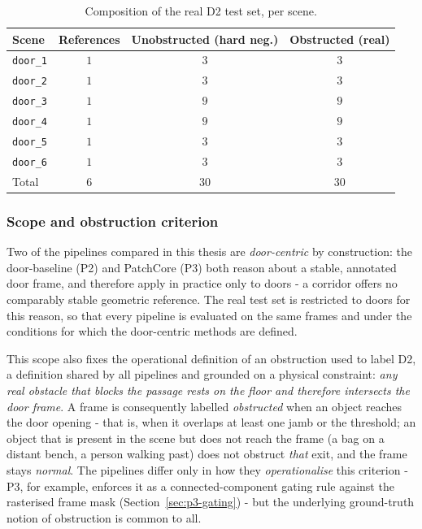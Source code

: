 \begin{table}[h]
  \centering
  \begin{tabular}{lccc}
    \hline
    Scene & References & Unobstructed (hard neg.) & Obstructed (real) \\
    \hline
    \texttt{door\_1} & $1$ & $3$ & $3$ \\
    \texttt{door\_2} & $1$ & $3$ & $3$ \\
    \texttt{door\_3} & $1$ & $9$ & $9$ \\
    \texttt{door\_4} & $1$ & $9$ & $9$ \\
    \texttt{door\_5} & $1$ & $3$ & $3$ \\
    \texttt{door\_6} & $1$ & $3$ & $3$ \\
    \hline
    Total & $6$ & $30$ & $30$ \\
    \hline
  \end{tabular}
  \caption{Composition of the real D2 test set, per scene.}
  \label{tab:ds-poli}
\end{table}

\subsubsection{Scope and obstruction criterion}
\label{sssec:ds-criterion}

Two of the pipelines compared in this thesis are \emph{door-centric} by
construction: the door-baseline (P2) and PatchCore (P3) both reason about a
stable, annotated door frame, and therefore apply in practice only to doors - a
corridor offers no comparably stable geometric reference. The real test set is
restricted to doors for this reason, so that every pipeline is evaluated on the
same frames and under the conditions for which the door-centric methods are
defined.

This scope also fixes the operational definition of an obstruction used to label
D2, a definition shared by all pipelines and grounded on a physical constraint:
\emph{any real obstacle that blocks the passage rests on the floor and therefore
intersects the door frame}. A frame is consequently labelled \emph{obstructed}
when an object reaches the door opening - that is, when it overlaps at least one
jamb or the threshold; an object that is present in the scene but does not reach
the frame (a bag on a distant bench, a person walking past) does not obstruct
\emph{that} exit, and the frame stays \emph{normal}. The pipelines differ only in
how they \emph{operationalise} this criterion - P3, for example, enforces it as a
connected-component gating rule against the rasterised frame mask
(Section~\ref{sec:p3-gating}) - but the underlying ground-truth notion of
obstruction is common to all.

